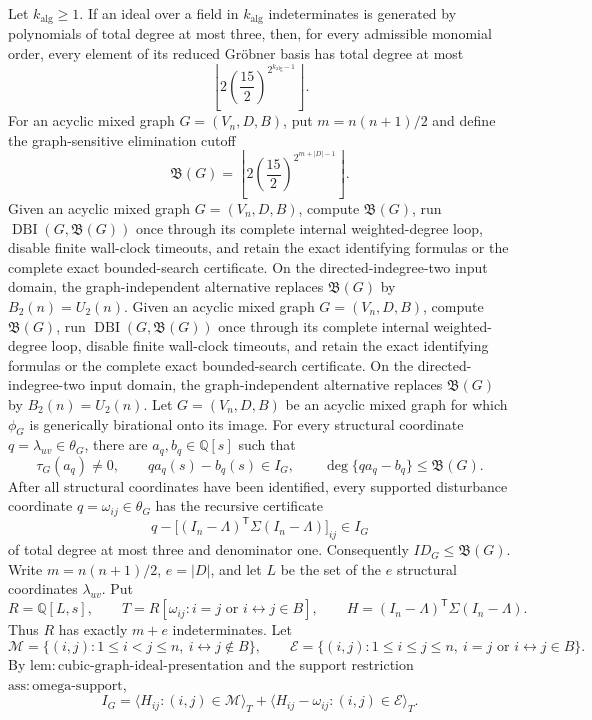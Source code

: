 Let \(k_{\mathrm{alg}}\geq 1\).  If an ideal over a field in \(k_{\mathrm{alg}}\) indeterminates is generated by polynomials of total degree at most three, then, for every admissible monomial order, every element of its reduced Gr\"obner basis has total degree at most
\[
 \left\lfloor
 2\left(\frac{15}{2}\right)^{2^{k_{\mathrm{alg}}-1}}
 \right\rfloor.
\]
For an acyclic mixed graph \(G=(V_n,D,B)\), put \(m=n(n+1)/2\) and define the graph-sensitive elimination cutoff
\[
 \mathfrak B(G)=
 \left\lfloor
 2\left(\frac{15}{2}\right)^{2^{m+|D|-1}}
 \right\rfloor.
\]
Given an acyclic mixed graph \(G=(V_n,D,B)\), compute \(\mathfrak B(G)\), run \(\operatorname{DBI}(G,\mathfrak B(G))\) once through its complete internal weighted-degree loop, disable finite wall-clock timeouts, and retain the exact identifying formulas or the complete exact bounded-search certificate.  On the directed-indegree-two input domain, the graph-independent alternative replaces \(\mathfrak B(G)\) by \(B_2(n)=U_2(n)\).
Given an acyclic mixed graph \(G=(V_n,D,B)\), compute \(\mathfrak B(G)\), run \(\operatorname{DBI}(G,\mathfrak B(G))\) once through its complete internal weighted-degree loop, disable finite wall-clock timeouts, and retain the exact identifying formulas or the complete exact bounded-search certificate.  On the directed-indegree-two input domain, the graph-independent alternative replaces \(\mathfrak B(G)\) by \(B_2(n)=U_2(n)\).
Let \(G=(V_n,D,B)\) be an acyclic mixed graph for which \(\phi_G\) is generically birational onto its image.  For every structural coordinate \(q=\lambda_{uv}\in\theta_G\), there are \(a_q,b_q\in\mathbb Q[s]\) such that
\[
 \tau_G(a_q)\neq0,
 \qquad
 q a_q(s)-b_q(s)\in I_G,
 \qquad
 \deg\{q a_q-b_q\}\leq\mathfrak B(G).
\]
After all structural coordinates have been identified, every supported disturbance coordinate \(q=\omega_{ij}\in\theta_G\) has the recursive certificate
\[
 q-\bigl[(I_n-\Lambda)^{\mathsf T}\Sigma(I_n-\Lambda)\bigr]_{ij}\in I_G
\]
of total degree at most three and denominator one.  Consequently \(ID_G\leq\mathfrak B(G)\).
Write \(m=n(n+1)/2\), \(e=|D|\), and let \(L\) be the set of the \(e\) structural coordinates \(\lambda_{uv}\).  Put
\[
 R=\mathbb Q[L,s],
 \qquad
 T=R[\omega_{ij}:i=j\text{ or }i\leftrightarrow j\in B],
 \qquad
 H=(I_n-\Lambda)^{\mathsf T}\Sigma(I_n-\Lambda).
 \tag{1}
\]
Thus \(R\) has exactly \(m+e\) indeterminates.  Let
\[
 \mathcal M=\lbrace(i,j):1\leq i<j\leq n,\ i\leftrightarrow j\notin B\rbrace,
 \qquad
 \mathcal E=\lbrace(i,j):1\leq i\leq j\leq n,\ i=j\text{ or }i\leftrightarrow j\in B\rbrace.
\]
By \(\mathrm{lem:cubic\mbox{-}graph\mbox{-}ideal\mbox{-}presentation}\) and the support restriction \(\mathrm{ass:omega\mbox{-}support}\),
\[
 I_G=
 \langle H_{ij}:(i,j)\in\mathcal M\rangle_T
 +\langle H_{ij}-\omega_{ij}:(i,j)\in\mathcal E\rangle_T.
 \tag{2}
\]

